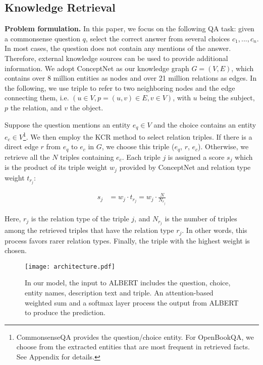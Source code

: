 \documentclass[11pt,a4paper]{article}
\begin{document}
\subsection{Knowledge Retrieval}
\label{sec:form}
\textbf{Problem formulation.} In this paper, we focus on the following QA task: given a commonsense question $q$, select the correct answer from several choices $c_1, ..., c_n$. In most cases, the question does not contain any mentions of the answer. Therefore, external knowledge sources can be used to provide additional information. We adopt ConceptNet \citep{conceptnet} as our knowledge graph $G=(V, E)$, which contains over 8 million entities as nodes and over 21 million relations as edges. In the following, we use triple to refer to two neighboring nodes and the edge connecting them, i.e. $(u\in V, p=(u, v)\in E, v\in V)$, with $u$ being the subject, $p$ the relation, and $v$ the object.

Suppose the question mentions an entity $e_q\in V$ and the choice contains an entity $e_c\in V$\footnote{CommonsenseQA provides the question/choice entity. For OpenBookQA, we choose from the extracted entities that are most frequent in retrieved facts. See Appendix for details.}.
We then employ the KCR method \citep{KCR} to select relation triples. If there is a direct edge $r$ from $e_q$ to $e_c$ in $G$, we choose this triple ($e_q$, $r$, $e_c$). Otherwise, we retrieve all the $N$ triples containing $e_c$. Each triple $j$ is assigned a score $s_j$ which is the product of its triple weight $w_j$ provided by ConceptNet and relation type weight $t_{r_j}$:

\begin{align}
    s_j &= w_j \cdot t_{r_j} = w_j\cdot \frac{N}{N_{r_j}}
\end{align}

Here, $r_j$ is the relation type of the triple $j$, and $N_{r_j}$ is the number of triples among the retrieved triples that have the relation type $r_j$. In other words, this process favors rarer relation types. Finally, the triple with the highest weight is chosen. 

\begin{figure*}[t]
    \centering
\texttt{[image: architecture.pdf]}
\caption{In our model, the input to ALBERT includes the question, choice, entity names, description text and triple. An attention-based weighted sum and a softmax layer process the output from ALBERT to produce the prediction.}
\label{fig:archi}
\end{figure*}
\end{document}
